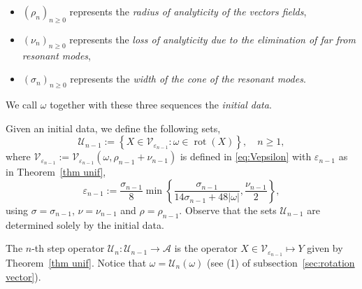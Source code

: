 \documentclass[12pt,reqno,a4paper]{amsart}%
\numberwithin{equation}{section}
\newcommand{\Vs}{{\mathscr{V}}}
\newcommand{\Us}{{\mathscr{U}}}
\newcommand{\A}{{\mathcal A}}
\newcommand{\UU}{{\mathcal U}}
\newcommand{\rot}{\operatorname{rot}}
\begin{document}
\begin{itemize}
\item $(\rho_n)_{n\geq0}$  represents the \textit{radius of analyticity of the vectors fields},
\item $(\nu_n)_{n\geq0}$  represents the \textit{loss of analyticity due to the elimination of far from resonant modes},
\item $(\sigma_n)_{n\geq0}$ represents the \textit{width of the cone of the resonant modes}.
\end{itemize}

We call $\omega$ together with these three sequences the \textit{initial data}.  

Given an initial data, we define the following sets,
$$
\Us_{n-1}:=\left\{X\in \Vs_{\varepsilon_{n-1}}\colon \omega\in\rot(X)\right\}, \quad n\geq1,
$$
where $\Vs_{\varepsilon_{n-1}} := \Vs_{\varepsilon_{n-1}}(\omega,\rho_{n-1}+\nu_{n-1})$ is defined in \eqref{eq:Vepsilon} with 
$\varepsilon_{n-1}$ as in Theorem~\ref{thm unif}, 
\begin{equation}\label{eq:varepsilon n minus 1}
\varepsilon_{n-1}:=\frac{\sigma_{n-1}}{8}\min\left\{\frac{\sigma_{n-1}}{14\sigma_{n-1} + 48|\omega|},\frac{\nu_{n-1}}2\right\},
\end{equation}
using $\sigma=\sigma_{n-1}$, $\nu=\nu_{n-1}$ and $\rho=\rho_{n-1}$.
Observe that the sets $\Us_{n-1}$ are determined solely by the initial data. 

The $n$-th step operator $\UU_n\colon \Us_{n-1}\to \A$ is the operator $X\in \Vs_{\varepsilon_{n-1}} \mapsto Y$ given by Theorem~\ref{thm unif}.  Notice that $\omega=\UU_n(\omega)$ (see (1) of subsection~\ref{sec:rotation vector}).
\end{document}
